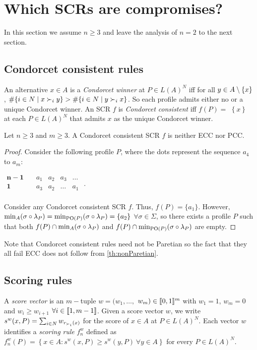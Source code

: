 \section{Which SCRs are compromises?}
\label{sec:more2voters}
In this section we assume $n\geq 3$ and leave the analysis of $n=2$ to the
next section.

\subsection{Condorcet consistent rules}

An alternative $x\in A$ is a \emph{Condorcet winner} at $P\in L(A)^{N}$ iff for all $y\in A \setminus \{x\} $, $\#\set{i \in N \suchthat x \prefi y} >\#\set{i \in N \suchthat y \prefi x}$. So each profile admits
either no or a unique Condorcet winner. An \ac{SCR} $f$ is \emph{Condorcet
	consistent} iff $f(P)=$ $\left\{ x\right\} $ at each $P\in L(A)^{N}$ that
admits $x$ as the unique Condorcet winner.

\begin{theorem} \label{th:condorcet}
	Let $n\geq 3$ and $m\geq 3$. A Condorcet consistent \ac{SCR} $f$ is neither \ac{ECC} nor \ac{PCC}.
\end{theorem}
\begin{proof}
	Consider the following profile $P$, where the dots represent the sequence $a_4$ to $a_m$:
	\begin{center}
		$
		\begin{array}{cccccc}
			\mathbf{n-1} \quad &a_1&a_2&a_3&\dots\\
			\mathbf{1} \quad &a_3&a_2&\dots&a_1\\
		\end{array}
		$ \quad.
	\end{center}
	
	Consider any Condorcet consistent \ac{SCR} $f$. Thus, $f(P)=\{a_1\}$. However, $\musigma=\mustar=\{a_2\}$ $\forall \sigma \in \Sigma$, so there exists a profile $P$ such that both $f(P)\cap \musigma$ and $f(P)\cap \mustar$ are empty.
\end{proof}

Note that Condorcet consistent rules need not be Paretian so the fact that they all fail \ac{ECC} does not follow from \cref{th:nonParetian}. 

\subsection{Scoring rules}
\label{sec:scoringrules}
A \emph{score vector} is an $m-$tuple $w=(w_{1},\dots,$ $w_{m})\in \llbracket0, 1\rrbracket^{m}$ with $w_{1}=1$, $w_{m}=0$ and $w_{i}\geq w_{i+1}$ $\forall i\in \llbracket1, m-1\rrbracket$. Given a score vector $w$, we write $s^{w}(x,P)=\sum_{i\in N}w_{r_{\prefi}(x)}$ for the score of $x\in A$ at $P\in L(A)^{N}$. Each vector $w$ identifies a \emph{scoring rule} $f^w_n$ defined as $f^w_n(P)=\left\{ x\in A:s^{w}(x,P)\geq s^{w}(y,P) \ \forall y\in A\right\}$ for every $P\in L(A)^{N}$.

